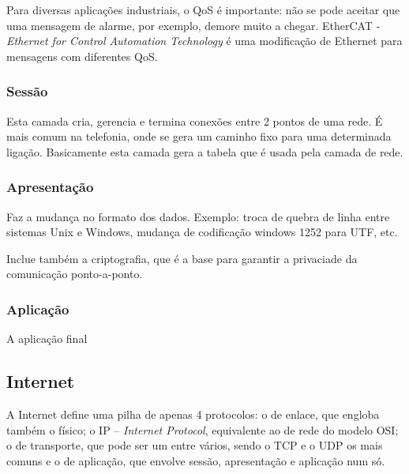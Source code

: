  Para diversas aplicações industriais, o QoS é importante: não se pode aceitar que uma mensagem de alarme, por exemplo, demore muito a chegar. EtherCAT - \emph{Ethernet for Control Automation Technology} é uma modificação de Ethernet para mensagens com diferentes QoS.
\subsubsection{Sessão}
Esta camada cria, gerencia e termina conexões entre 2 pontos de uma rede. É mais comum na telefonia, onde se gera um caminho fixo para uma determinada ligação. Basicamente esta camada gera a tabela que é usada pela camada de rede.
\subsubsection{Apresentação}
Faz a mudança no formato dos dados. Exemplo: troca de quebra de linha entre sistemas Unix e Windows, mudança de codificação windows 1252 para UTF, etc.

Inclue também a criptografia, que é a base para garantir a privaciade da comunicação ponto-a-ponto.
\subsubsection{Aplicação}
A aplicação final
\subsection{Internet}
	A Internet define uma pilha de apenas 4 protocolos: o de enlace, que engloba também o físico; o IP -- \emph{Internet Protocol}, equivalente ao de rede do modelo OSI; o de transporte, que pode ser um entre vários, sendo o TCP e o UDP os mais comuns e o de aplicação, que envolve sessão, apresentação e aplicação num só.

